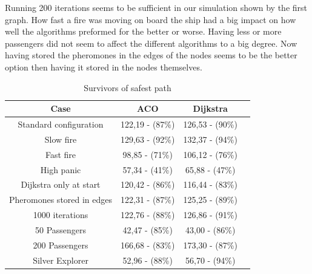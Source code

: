 Running 200 iterations seems to be sufficient in our simulation shown by the first graph. How fast a fire was moving on board the ship had a big impact on how well the algorithms preformed for the better or worse. Having less or more passengers did not seem to affect the different algorithms to a big degree. Now having stored the pheromones in the edges of the nodes seems to be the better option then having it stored in the nodes themselves.



\begin{table}[ht]
\caption{Survivors of safest path} 				%
\centering										%
\begin{tabular}{c c c c}						%
\hline
\hline 											%
Case & ACO & Dijkstra \\[0.5ex]%
\hline											%
Standard configuration & 122,19 - (87\%) & 126,53 - (90\%) \\
Slow fire & 129,63 - (92\%) & 132,37 - (94\%) \\
Fast fire & 98,85 - (71\%) & 106,12 - (76\%) \\
High panic & 57,34 - (41\%) & 65,88 - (47\%) \\
Dijkstra only at start & 120,42 - (86\%) & 116,44 - (83\%) \\
Pheromones stored in edges & 122,31 - (87\%) & 125,25 - (89\%) \\
1000 iterations & 122,76 - (88\%) & 126,86 - (91\%) \\
50 Passengers & 42,47 - (85\%) & 43,00 - (86\%) \\
200 Passengers & 166,68 - (83\%) & 173,30 - (87\%) \\ 
Silver Explorer & 52,96 - (88\%) & 56,70 - (94\%) \\ [1ex]						%
\hline														%

\end{tabular}
\label{table:tableSafest}								
\end{table}


